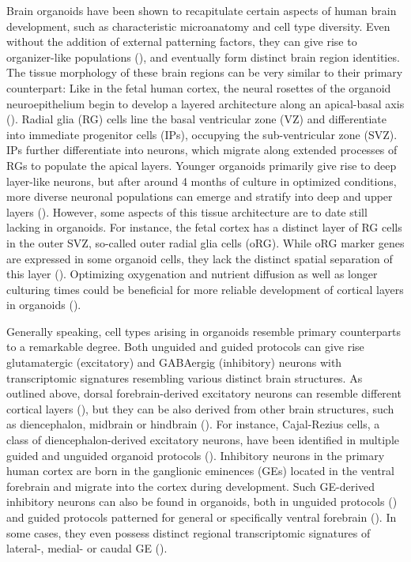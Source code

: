 Brain organoids have been shown to recapitulate certain aspects of human brain development, such as characteristic microanatomy and cell type diversity. Even without the addition of external patterning factors, they can give rise to organizer-like populations (\cite{renner_self-organized_2017}), and eventually form distinct brain region identities. The tissue morphology of these brain regions can be very similar to their primary counterpart: Like in the fetal human cortex, the neural rosettes of the organoid neuroepithelium begin to develop a layered architecture along an apical-basal axis (\cite{kadoshima_self-organization_2013,lancaster_cerebral_2013}). Radial glia (RG) cells line the basal ventricular zone (VZ) and differentiate into immediate progenitor cells (IPs), occupying the sub-ventricular zone (SVZ). IPs further differentiate into neurons, which migrate along extended processes of RGs to populate the apical layers. Younger organoids primarily give rise to deep layer-like neurons, but after around 4 months of culture in optimized conditions, more diverse neuronal populations can emerge and stratify into deep and upper layers (\cite{kanton_organoid_2019,qian_sliced_2020}). However, some aspects of this tissue architecture are to date still lacking in organoids. For instance, the fetal cortex has a distinct layer of RG cells in the outer SVZ, so-called outer radial glia cells (oRG). While oRG marker genes are expressed in some organoid cells, they lack the distinct spatial separation of this layer (\cite{bhaduri_cell_2020}). Optimizing oxygenation and nutrient diffusion as well as longer culturing times could be beneficial for more reliable development of cortical layers in organoids (\cite{bhaduri_cell_2020,chiaradia_brain_2020}).

Generally speaking, cell types arising in organoids resemble primary counterparts to a remarkable degree. Both unguided and guided protocols can give rise glutamatergic (excitatory) and GABAergig (inhibitory) neurons with transcriptomic signatures resembling various distinct brain structures. As outlined above, dorsal forebrain-derived excitatory neurons can resemble different cortical layers (\cite{kanton_organoid_2019,qian_sliced_2020}), but they can be also derived from other brain structures, such as diencephalon, midbrain or hindbrain (\cite{kanton_organoid_2019}). For instance, Cajal-Rezius cells, a class of diencephalon-derived excitatory neurons, have been identified in multiple guided and unguided organoid protocols (\cite{kanton_organoid_2019,velasco_individual_2019}). Inhibitory neurons in the primary human cortex are born in the ganglionic eminences (GEs) located in the ventral forebrain and migrate into the cortex during development. Such GE-derived inhibitory neurons can also be found in organoids, both in unguided protocols (\cite{kanton_organoid_2019}) and guided protocols patterned for general or specifically ventral forebrain (\cite{velasco_individual_2019,birey_assembly_2017,miura_generation_2020}). In some cases, they even possess distinct regional transcriptomic signatures of lateral-, medial- or caudal GE (\cite{kanton_organoid_2019,miura_generation_2020}). 

